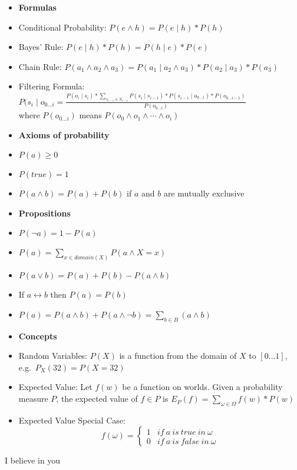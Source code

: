 \documentclass[11pt,landscape]{memoir}
\begin{document}
\begin{multicols}{2}

\begin{itemize}
    \item \textbf{Formulas}
    \item Conditional Probability: $P(e \land h) = P(e \mid h) * P(h)$
    \item Bayes' Rule: $P(e \mid h) * P(h) = P(h \mid e) * P(e)$
    \item Chain Rule: $P(a_1 \land a_2 \land a_3) = P(a_1 \mid a_2 \land a_3) * P(a_2 \mid a_3) * P(a_3)$
    \item Filtering Formula: $P(s_i \mid o_{0 \ldots i} = \frac{P(o_i \mid s_i) * \sum_{s_{i-1} \in S_{i-1}} P(s_i \mid s_{i-1}) * P(s_{i-1} \mid o_{0 \ldots 1}) * P(o_{0 \ldots i-1})}{P(o_{0 \ldots i})}$ \\
        where $P(o_{0 \ldots i})$ means $P(o_0 \land o_1 \land \cdots \land o_i)$
\end{itemize}

\begin{itemize}
    \item \textbf{Axioms of probability}
    \item $P(a) \ge 0$
    \item $P(true) = 1$
    \item $P(a \land b) = P(a) + P(b)$ if $a$ and $b$ are mutually exclusive
\end{itemize}

\begin{itemize}
    \item \textbf{Propositions}
    \item $P(\lnot a) = 1 - P(a)$
    \item $P(a) = \sum_{x \in domain(X)} P(a \land X = x)$
    \item $P(a \lor b) = P(a) + P(b) - P(a \land b)$
    \item If $a \leftrightarrow b$ then $P(a) = P(b)$
    \item $P(a) = P(a \land b) + P(a \land \lnot b) = \sum_{b \in B}(a \land b)$
\end{itemize}

\begin{itemize}
    \item \textbf{Concepts}
    \item Random Variables: $P(X)$ is a function from the domain of $X$ to $[0 \ldots 1]$, e.g.\ $P_X(32) = P(X=32)$
    \item Expected Value: Let $f(w)$ be a function on worlds. Given a probability measure $P$, the expected value of $f \in P$ is $E_P(f) = \sum_{\omega \in \Omega} f(w) * P(w)$
    \item Expected Value Special Case: \\
        \[ f(\omega) =
        \begin{cases}
            1 & if\ a\ is\ true\ in\ \omega \\
            0 & if\ a\ is\ false\ in\ \omega
        \end{cases}
        \]
\end{itemize}


\end{multicols}

\tiny{I believe in you}
\end{document}
